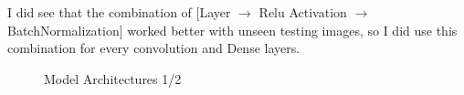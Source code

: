 \documentclass[12pt]{article}
\begin{document}
I did see that the combination of [Layer $\rightarrow$ Relu Activation $\rightarrow$ BatchNormalization] worked better with unseen testing images, so I did use this combination for every convolution and Dense layers. \\



\begin{figure}[h]
    \centering
    \hfill %
    \caption{Model Architectures 1/2}
\end{figure}
\end{document}
